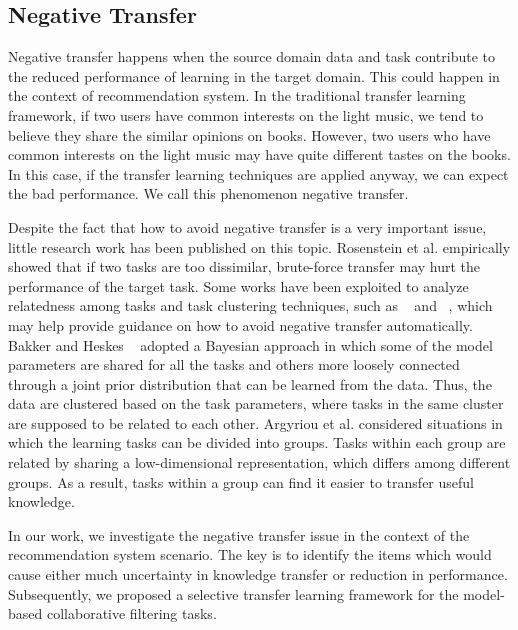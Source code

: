 \hspace{0.05in}
\subsection{Negative Transfer}
Negative transfer happens when the source domain data and task contribute to the reduced performance of learning in the target domain.
This could happen in the context of recommendation system. In the traditional transfer learning framework, if two users have common interests on the light music, we tend to believe they share the similar opinions on books. However, two users who have common interests on the light music may have quite different tastes on the books. In this case, if the transfer learning techniques are applied anyway, we can expect the bad performance. We call this phenomenon negative transfer.

Despite the fact that how to avoid negative transfer is a very important issue, little research work has been published on this topic. Rosenstein et al. \cite{rosenstein2005transfer} empirically showed that if two tasks are too dissimilar, brute-force transfer may hurt the performance of the target task. Some works have been exploited to analyze relatedness among tasks and task clustering techniques, such as ~\cite{ben2003exploiting} and ~\cite{bakker2003task}, which may help provide guidance on how to avoid negative transfer automatically. Bakker and Heskes ~\cite{bakker2003task} adopted a Bayesian approach in which some of the model parameters are shared for all the tasks and others more loosely connected through a joint prior distribution that can be learned from the data. Thus, the data are clustered based on the task parameters, where tasks in the same cluster are
supposed to be related to each other. Argyriou et al. \cite{argyriou2008algorithm} considered situations in which the learning tasks can be divided into groups. Tasks within each group are related by sharing a low-dimensional representation, which differs among different groups. As a result, tasks within a group can find it easier to transfer useful knowledge.

In our work, we investigate the negative transfer issue in the context of the recommendation system scenario. The key is to identify the items which would cause either much uncertainty in knowledge transfer or reduction in performance. Subsequently, we proposed a selective transfer learning framework for the model-based collaborative filtering tasks.

\hspace{0.05in}
